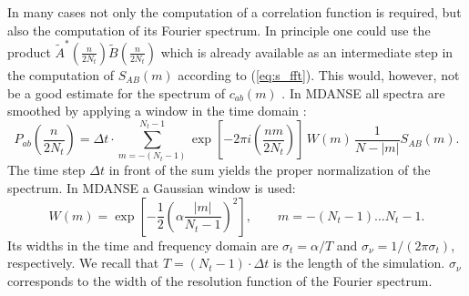 \documentclass[a4paper,11pt]{article}
\begin{document}
\begin{appendices}
In many cases not only the computation of a correlation function is
required, but also the computation of its Fourier spectrum. In
principle one could use the product $\tilde
A^*\left(\frac{n}{2N_t}\right) \tilde B\left(\frac{n}{2N_t}\right)$
which is already available as an intermediate step in the computation
of $S_{AB}(m)$ according to (\ref{eq:s_fft}). This would, however, not
be a good estimate for the spectrum of $c_{ab}(m)$ \cite{Papoulis:1984}. In
\gls{MDANSE} all spectra are smoothed by applying a window in the time
domain \cite{Papoulis:1984}: 
\begin{equation}
P_{ab}\left(\frac{n}{2N_t}\right) =
\Delta t\cdot \sum_{m=-(N_t-1)}^{N_t-1} 
\exp\left[-2\pi i\left(\frac{n m}{2N_t}\right)\right]
\,W(m)\,\frac{1}{N-|m|}S_{AB}(m).
\end{equation}
The time step $\Delta t$ in front of the sum yields the proper
normalization of the spectrum. In \gls{MDANSE} a Gaussian window
\cite{Harris} is used:
\begin{equation}
\label{eq:gauss_window}
W(m) = \exp\left[
-\frac{1}{2}\left(\alpha\frac{|m|}{N_t-1}\right)^2
\right],
\qquad m = -(N_t-1)\ldots N_t-1.
\end{equation}
Its widths in the time and frequency domain are $\sigma_t = \alpha/T$
and $\sigma_\nu = 1/(2\pi\sigma_t)$, respectively. We recall that $T =
(N_t-1)\cdot\Delta t$ is the length of the simulation. $\sigma_\nu$ 
corresponds to the width of the resolution function of the Fourier spectrum.
\end{appendices}

\newpage

\printglossary[type=acronym]
\end{document}
